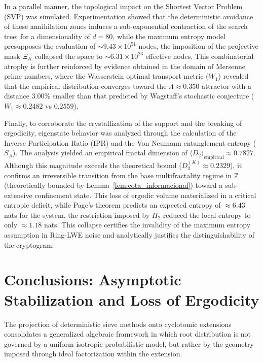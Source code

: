 \documentclass{article}
\numberwithin{equation}{section}
\theoremstyle{plain}
\theoremstyle{definition}
\begin{document}
In a parallel manner, the topological impact on the Shortest Vector Problem (SVP) was simulated. Experimentation showed that the deterministic avoidance of these annihilation zones induces a sub-exponential contraction of the search tree; for a dimensionality of $d=80$, while the maximum entropy model presupposes the evaluation of $\sim 9.43 \times 10^{51}$ nodes, the imposition of the projective mask $\Xi_K$ collapsed the space to $\sim 6.31 \times 10^{23}$ effective nodes. This combinatorial atrophy is further reinforced by evidence obtained in the domain of Mersenne prime numbers, where the Wasserstein optimal transport metric ($W_1$) revealed that the empirical distribution converges toward the $\Lambda \approx 0.350$ attractor with a distance $3.00\%$ smaller than that predicted by Wagstaff's stochastic conjecture ($W_1 \approx 0.2482$ vs $0.2559$).

Finally, to corroborate the crystallization of the support and the breaking of ergodicity, eigenstate behavior was analyzed through the calculation of the Inverse Participation Ratio (IPR) and the Von Neumann entanglement entropy ($S_A$). The analysis yielded an empirical fractal dimension of $\langle D_2 \rangle_{\text{empirical}} \approx 0.7827$. Although this magnitude exceeds the theoretical bound ($D_2^{(K)} \approx 0.2329$), it confirms an irreversible transition from the base multifractality regime in $\mathbb{Z}$ (theoretically bounded by Lemma~\ref{lem:cota_informacional}) toward a sub-extensive confinement state. This loss of ergodic volume materialized in a critical entropic deficit, while Page’s theorem predicts an expected entropy of $\approx 6.43$ nats for the system, the restriction imposed by $\Pi_2$ reduced the local entropy to only $\approx 1.18$ nats. This collapse certifies the invalidity of the maximum entropy assumption in Ring-LWE noise and analytically justifies the distinguishability of the cryptogram.

\section{Conclusions: Asymptotic Stabilization and Loss of Ergodicity}
\label{sec:discusion_conclusiones}

The projection of deterministic sieve methods onto cyclotomic extensions consolidates a generalized algebraic framework in which root distribution is not governed by a uniform isotropic probabilistic model, but rather by the geometry imposed through ideal factorization within the extension.
\end{document}
